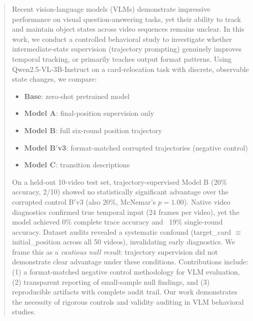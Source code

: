 \begin{abstract}

Recent vision-language models (VLMs) demonstrate impressive performance on visual question-answering tasks, yet their ability to track and maintain object states across video sequences remains unclear. In this work, we conduct a controlled behavioral study to investigate whether intermediate-state supervision (trajectory prompting) genuinely improves temporal tracking, or primarily teaches output format patterns. Using Qwen2.5-VL-3B-Instruct on a card-relocation task with discrete, observable state changes, we compare:
\begin{itemize}
    \item \textbf{Base}: zero-shot pretrained model
    \item \textbf{Model A}: final-position supervision only
    \item \textbf{Model B}: full six-round position trajectory
    \item \textbf{Model B$'$v3}: format-matched corrupted trajectories (negative control)
    \item \textbf{Model C}: transition descriptions
\end{itemize}

On a held-out 10-video test set, trajectory-supervised Model B (20\% accuracy, 2/10) showed no statistically significant advantage over the corrupted control B$'$v3 (also 20\%, McNemar's $p=1.00$). Native video diagnostics confirmed true temporal input (24 frames per video), yet the model achieved 0\% complete trace accuracy and ~19\% single-round accuracy. Dataset audits revealed a systematic confound (target\_card $\equiv$ initial\_position across all 50 videos), invalidating early diagnostics. We frame this as a \emph{cautious null result}: trajectory supervision did not demonstrate clear advantage under these conditions. Contributions include: (1) a format-matched negative control methodology for VLM evaluation, (2) transparent reporting of small-sample null findings, and (3) reproducible artifacts with complete audit trail. Our work demonstrates the necessity of rigorous controls and validity auditing in VLM behavioral studies.

\end{abstract}

